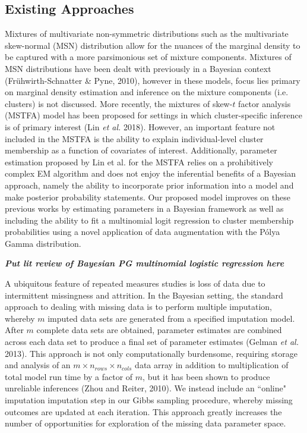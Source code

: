 \documentclass[useAMS,referee]{biom}
\begin{document}
\subsection{Existing Approaches}

Mixtures of multivariate non-symmetric distributions such as the multivariate skew-normal (MSN) distribution allow for the nuances of the marginal density to be captured with a more parsimonious set of mixture components. Mixtures of MSN distributions have been dealt with previously in a Bayesian context (Fr\"{u}hwirth-Schnatter \& Pyne, 2010), however in these models, focus lies primary on marginal density estimation and inference on the mixture components (i.e. clusters) is not discussed. More recently, the mixtures of skew-$t$ factor analysis (MSTFA) model has been proposed for settings in which cluster-specific inference is of primary interest (Lin \textit{et al.} 2018). However, an important feature not included in the MSTFA is the ability to explain individual-level cluster membership as a function of covariates of interest. Additionally, parameter estimation proposed by Lin et al. for the MSTFA relies on a prohibitively complex EM algorithm and does not enjoy the inferential benefits of a Bayesian approach, namely the ability to incorporate prior information into a model and make posterior probability statements. Our proposed model improves on these previous works by estimating parameters in a Bayesian framework as well as including the ability to fit a multinomial logit regression to cluster membership probabilities using a novel application of data augmentation with the P\'olya Gamma distribution.

\textbf{\textit{Put lit review of Bayesian PG multinomial logistic regression here}}

A ubiquitous feature of repeated measures studies is loss of data due to intermittent missingness and attrition. In the Bayesian setting, the standard approach to dealing with missing data is to perform multiple imputation, whereby $m$ imputed data sets are generated from a specified imputation model. After $m$ complete data sets are obtained, parameter estimates are combined across each data set to produce a final set of parameter estimates (Gelman \textit{et al.} 2013). This approach is not only computationally burdensome, requiring storage and analysis of an $m \times n_{rows} \times n_{cols}$ data array in addition to multiplication of total model run time by a factor of $m$, but it has been shown to produce unreliable inferences (Zhou and Reiter, 2010). We instead include an ``online" imputation imputation step in our Gibbs sampling procedure, whereby missing outcomes are updated at each iteration. This approach greatly increases the number of opportunities for exploration of the missing data parameter space.
\end{document}

